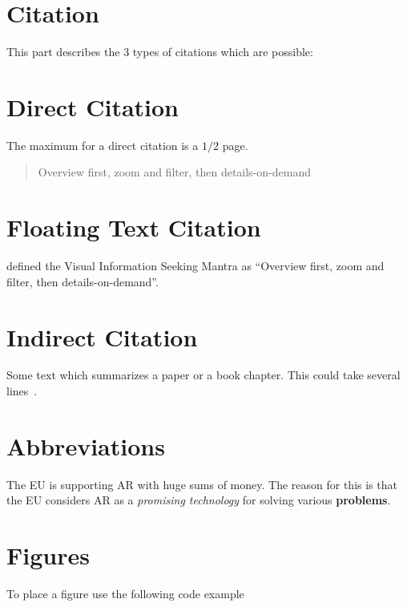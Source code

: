 \section{Citation}

This part describes the 3 types of citations which are possible:

\section{Direct Citation}

The maximum for a direct citation is a ${1/2}$ page.

\begin{quotation}
	Overview first, zoom and filter, then details-on-demand~\parencite{shneiderman_eyes_1996}
\end{quotation}

\section{Floating Text Citation}

\cite{shneiderman_eyes_1996} defined the Visual Information Seeking Mantra as ``Overview first, zoom and filter, then details-on-demand''. 
\parencite{kahneman_thinking_2012}

\section{Indirect Citation}

Some text which summarizes a paper or a book chapter. This could take several lines~\parencite{shneiderman_eyes_1996}.

\section{Abbreviations}

The \ac{EU} is supporting \ac{AR} with huge sums of money. The reason for this is that the \ac{EU} considers \ac{AR} as a \textit{promising technology} for solving various \textbf{problems}.

\newpage
\section{Figures}

To place a figure use the following code example


